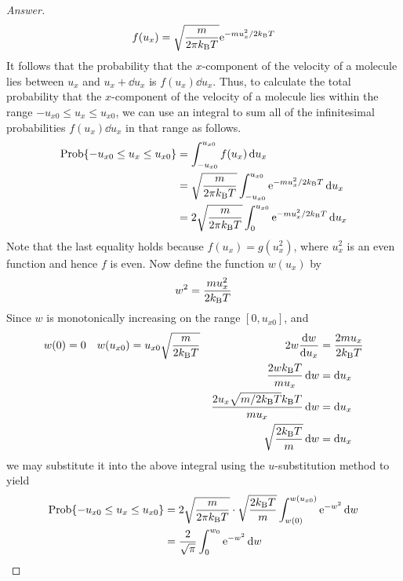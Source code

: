 \documentclass[../psets.tex]{subfiles}
\begin{document}
\begin{enumerate}[label={\textbf{27-\arabic*.}},leftmargin=3.5em]
\begin{proof}[Answer]
        \begin{equation*}
            f(u_x) = \sqrt{\frac{m}{2\pi\kB T}}\e[-mu_x^2/2\kB T]
        \end{equation*}
        It follows that the probability that the $x$-component of the velocity of a molecule lies between $u_x$ and $u_x+\dd{u_x}$ is $f(u_x)\dd{u_x}$. Thus, to calculate the total probability that the $x$-component of the velocity of a molecule lies within the range $-u_{x0}\leq u_x\leq u_{x0}$, we can use an integral to sum all of the infinitesimal probabilities $f(u_x)\dd{u_x}$ in that range as follows.
        \begin{align*}
            \Prob\{-u_{x0}\leq u_x\leq u_{x0}\} &= \int_{-u_{x0}}^{u_{x0}}f(u_x)\dd{u_x}\\
            &= \sqrt{\frac{m}{2\pi\kB T}}\int_{-u_{x0}}^{u_{x0}}\e[-mu_x^2/2\kB T]\dd{u_x}\\
            &= 2\sqrt{\frac{m}{2\pi\kB T}}\int_0^{u_{x0}}\e[-mu_x^2/2\kB T]\dd{u_x}
        \end{align*}
        Note that the last equality holds because $f(u_x)=g(u_x^2)$, where $u_x^2$ is an even function and hence $f$ is even. Now define the function $w(u_x)$ by
        \begin{equation*}
            w^2 = \frac{mu_x^2}{2\kB T}
        \end{equation*}
        Since $w$ is monotonically increasing on the range $[0,u_{x0}]$, and
        \begin{align*}
            w(0) &= 0&
                w(u_{x0}) &= u_{x0}\sqrt{\frac{m}{2\kB T}}&
                    2w\dv{w}{u_x} &= \frac{2mu_x}{2\kB T}\\
            &&
                &&
                    \frac{2w\kB T}{mu_x}\dd{w} &= \dd{u_x}\\
            &&
                &&
                    \frac{2u_x\sqrt{m/2\kB T}\kB T}{mu_x}\dd{w} &= \dd{u_x}\\
            &&
                &&
                    \sqrt{\frac{2\kB T}{m}}\dd{w} &= \dd{u_x}
        \end{align*}
        we may substitute it into the above integral using the $u$-substitution method to yield
        \begin{align*}
            \Prob\{-u_{x0}\leq u_x\leq u_{x0}\} &= 2\sqrt{\frac{m}{2\pi\kB T}}\cdot\sqrt{\frac{2\kB T}{m}}\int_{w(0)}^{w(u_{x0})}\e[-w^2]\dd{w}\\
            &= \frac{2}{\sqrt{\pi}}\int_{0}^{w_0}\e[-w^2]\dd{w}
        \end{align*}

\end{proof}
\end{enumerate}
\end{document}
